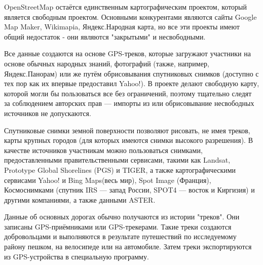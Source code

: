 \documentclass[12pt,a4paper,oneside]{article} %
\begin{document}
OpenStreetMap остаётся единственным картографическим проектом, \linebreak
который является свободным проектом. Основными конкурентами \linebreak
являются сайты Google Map Maker, Wikimapia, Яндекс.Народная карта,\linebreak
 но все эти проекты имеют общий недостаток - они являются \linebreak
 "закрытыми" и несвободными.

Все данные создаются на основе GPS-треков, которые загружают \linebreak
участники на основе обычных народных знаний, фотографий (также,\linebreak
например, Яндекс.Панорам) или же путём обрисовывания \linebreak
спутниковых снимков (доступно с тех пор как их впервые \linebreak
предоставил Yahoo!). В проекте делают свободную карту, которой\linebreak
могли бы пользоваться все без ограничений, поэтому тщательно\linebreak
следят за соблюдением авторских прав — импорты из или\linebreak
обрисовывание несвободных источников не допускаются.

Спутниковые снимки земной поверхности позволяют рисовать, не имея \linebreak
треков, карты крупных городов (для которых имеются снимки \linebreak
высокого разрешения). В качестве источников участникам можно \linebreak
пользоваться снимками, предоставленными правительственными сервисами,\linebreak 
такими как Landsat, Prototype Global Shorelines (PGS) и TIGER,\linebreak
а также картографическими сервисами Yahoo! и Bing Maps(весь мир), \linebreak
Spot Image (Франция), Космоснимками (спутник IRS — запад России, \linebreak
SPOT4 — восток и Киргизия) и другими компаниями, а также данными \linebreak
ASTER.

Данные об основных дорогах обычно получаются из истории "треков". \linebreak
Они записаны GPS-приёмниками или GPS-трекерами. Такие треки \linebreak
создаются добровольцами и выполняются в результате путешествий по \linebreak
исследуемому району пешком, на велосипеде или на автомобиле. Затем \linebreak
треки экспортируются из GPS-устройства в специальную программу.
\end{document}

